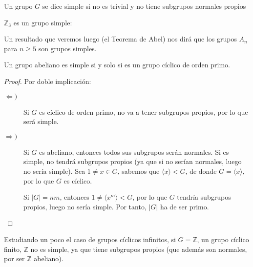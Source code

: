\begin{definicion}
    Un grupo $G$ se dice simple si no es trivial y no tiene subgrupos normales propios
\end{definicion}

\begin{ejemplo}
    $\mathbb{Z}_3$ es un grupo simple:
    \begin{figure}[H]
        \centering
    \end{figure}
    Un resultado que veremos luego (el Teorema de Abel) nos dirá que los grupos $A_n$ para $n\geq 5$ son grupos simples.
\end{ejemplo}

\begin{prop}
    Un grupo abeliano es simple si y solo si es un grupo cíclico de orden primo.
    \begin{proof}
        Por doble implicación:
        \begin{description}
            \item [$\Longleftarrow)$] Si $G$ es cíclico de orden primo, no va a tener subgrupos propios, por lo que será simple.
            \item [$\Longrightarrow)$] Si $G$ es abeliano, entonces todos sus subgrupos serán normales. Si es simple, no tendrá subgrupos propios (ya que si no serían normales, luego no sería simple). Sea $1\neq x\in G$, sabemos que $\langle x \rangle < G$, de donde $G = \langle x \rangle $, por lo que $G$ es cíclico.

                Si $|G| = nm$, entonces $1\neq \langle x^m \rangle < G$, por lo que $G$ tendría subgrupos propios, luego no sería simple. Por tanto, $|G|$ ha de ser primo.
        \end{description}
    \end{proof}
\end{prop}

\begin{ejemplo}
    Estudiando un poco el caso de grupos cíclicos infinitos, si $G=\mathbb{Z}$, un grupo cíclico finito, $\mathbb{Z}$ no es simple, ya que tiene subgrupos propios (que además son normales, por ser $\mathbb{Z}$ abeliano).
\end{ejemplo}

